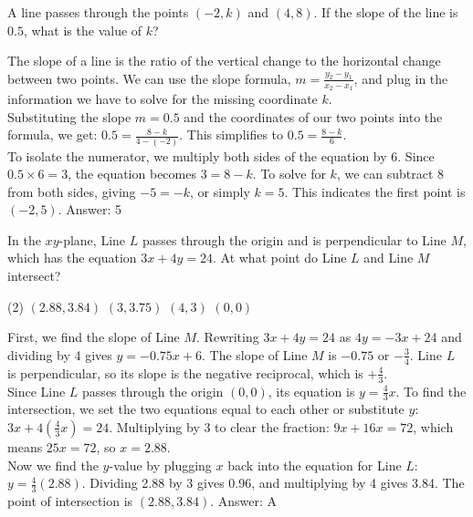 \documentclass[11pt,paper=a4,answers]{exam}
\begin{document}
\begin{questions}
\question
A line passes through the points $(-2, k)$ and $(4, 8)$. If the slope of the line is $0.5$, what is the value of $k$?

\begin{solution}
The slope of a line is the ratio of the vertical change to the horizontal change between two points. We can use the slope formula, $m = \frac{y_2 - y_1}{x_2 - x_1}$, and plug in the information we have to solve for the missing coordinate $k$.
\\[10pt]
Substituting the slope $m = 0.5$ and the coordinates of our two points into the formula, we get: $0.5 = \frac{8 - k}{4 - (-2)}$. This simplifies to $0.5 = \frac{8 - k}{6}$. 
\\[10pt]
To isolate the numerator, we multiply both sides of the equation by 6. Since $0.5 \times 6 = 3$, the equation becomes $3 = 8 - k$. To solve for $k$, we can subtract 8 from both sides, giving $-5 = -k$, or simply $k = 5$. This indicates the first point is $(-2, 5)$.
\vspace{15pt}
Answer: \colorbox{yellow!100}{5}
\end{solution}

\question
In the $xy$-plane, Line $L$ passes through the origin and is perpendicular to Line $M$, which has the equation $3x + 4y = 24$. At what point do Line $L$ and Line $M$ intersect?
\begin{tasks}(2)
    \task $(2.88, 3.84)$
    \task $(3, 3.75)$
    \task $(4, 3)$
    \task $(0, 0)$
\end{tasks}

\begin{solution}
First, we find the slope of Line $M$. Rewriting $3x + 4y = 24$ as $4y = -3x + 24$ and dividing by 4 gives $y = -0.75x + 6$. The slope of Line $M$ is $-0.75$ or $-\frac{3}{4}$. Line $L$ is perpendicular, so its slope is the negative reciprocal, which is $+\frac{4}{3}$.
\\[10pt]
Since Line $L$ passes through the origin $(0, 0)$, its equation is $y = \frac{4}{3}x$. To find the intersection, we set the two equations equal to each other or substitute $y$: $3x + 4(\frac{4}{3}x) = 24$. Multiplying by 3 to clear the fraction: $9x + 16x = 72$, which means $25x = 72$, so $x = 2.88$.
\\[10pt]
Now we find the $y$-value by plugging $x$ back into the equation for Line $L$: $y = \frac{4}{3}(2.88)$. Dividing 2.88 by 3 gives 0.96, and multiplying by 4 gives 3.84. The point of intersection is $(2.88, 3.84)$.
\vspace{15pt}
Answer: \colorbox{yellow!100}{A}
\end{solution}


\end{questions}
\end{document}
